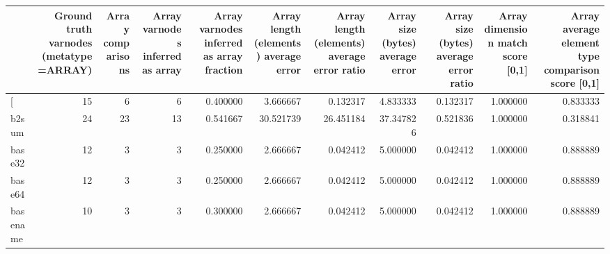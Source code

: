 \begin{tabular}{lrrrrrrrrrr}
\toprule
{} &  Ground truth varnodes (metatype=ARRAY) &  Array comparisons &  Array varnodes inferred as array &  Array varnodes inferred as array fraction &  Array length (elements) average error &  Array length (elements) average error ratio &  Array size (bytes) average error &  Array size (bytes) average error ratio &  Array dimension match score [0,1] &  Array average element type comparison score [0,1] \\
\midrule
[         &                                      15 &                  6 &                                 6 &                                   0.400000 &                               3.666667 &                                     0.132317 &                          4.833333 &                                0.132317 &                           1.000000 &                                           0.833333 \\
b2sum     &                                      24 &                 23 &                                13 &                                   0.541667 &                              30.521739 &                                    26.451184 &                         37.347826 &                                0.521836 &                           1.000000 &                                           0.318841 \\
base32    &                                      12 &                  3 &                                 3 &                                   0.250000 &                               2.666667 &                                     0.042412 &                          5.000000 &                                0.042412 &                           1.000000 &                                           0.888889 \\
base64    &                                      12 &                  3 &                                 3 &                                   0.250000 &                               2.666667 &                                     0.042412 &                          5.000000 &                                0.042412 &                           1.000000 &                                           0.888889 \\
basename  &                                      10 &                  3 &                                 3 &                                   0.300000 &                               2.666667 &                                     0.042412 &                          5.000000 &                                0.042412 &                           1.000000 &                                           0.888889 \\

\end{tabular}
